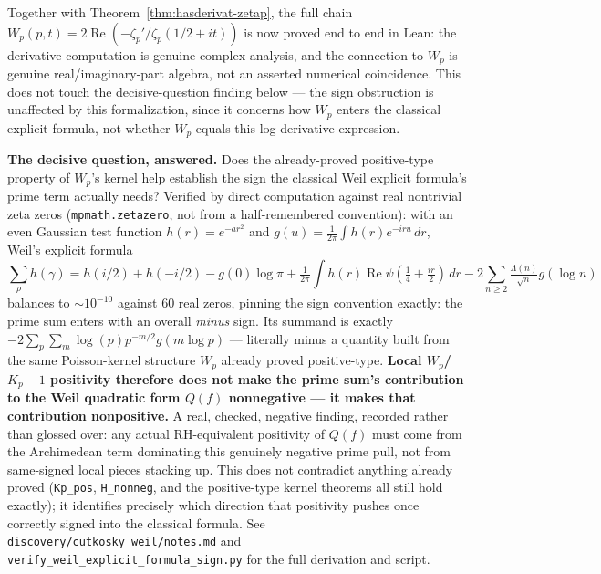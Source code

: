 \documentclass{report}
\theoremstyle{definition}
\begin{document}
Together with Theorem~\ref{thm:hasderivat-zetap}, the full chain
$W_p(p,t) = 2\operatorname{Re}(-\zeta_p'/\zeta_p(1/2+it))$ is now proved end to end in Lean:
the derivative computation is genuine complex analysis, and the connection to $W_p$ is
genuine real/imaginary-part algebra, not an asserted numerical coincidence. This does not
touch the decisive-question finding below --- the sign obstruction is unaffected by this
formalization, since it concerns how $W_p$ enters the classical explicit formula, not
whether $W_p$ equals this log-derivative expression.

\textbf{The decisive question, answered.} Does the already-proved positive-type property
of $W_p$'s kernel help establish the sign the classical Weil explicit formula's prime
term actually needs? Verified by direct computation against real nontrivial zeta zeros
(\texttt{mpmath.zetazero}, not from a half-remembered convention): with an even Gaussian
test function $h(r)=e^{-ar^2}$ and $g(u)=\tfrac1{2\pi}\int h(r)e^{-iru}\,dr$, Weil's
explicit formula
\[
\textstyle\sum_\rho h(\gamma) = h(i/2)+h(-i/2) - g(0)\log\pi
+ \tfrac1{2\pi}\int h(r)\operatorname{Re}\psi(\tfrac14+\tfrac{ir}2)\,dr
- 2\sum_{n\ge2}\tfrac{\Lambda(n)}{\sqrt n}g(\log n)
\]
balances to $\sim10^{-10}$ against 60 real zeros, pinning the sign convention exactly:
the prime sum enters with an overall \emph{minus} sign. Its summand is exactly
$-2\sum_p\sum_m\log(p)p^{-m/2}g(m\log p)$ --- literally minus a quantity built from the
same Poisson-kernel structure $W_p$ already proved positive-type. \textbf{Local
$W_p$/$K_p-1$ positivity therefore does not make the prime sum's contribution to the
Weil quadratic form $Q(f)$ nonnegative --- it makes that contribution nonpositive.} A
real, checked, negative finding, recorded rather than glossed over: any actual
RH-equivalent positivity of $Q(f)$ must come from the Archimedean term dominating this
genuinely negative prime pull, not from same-signed local pieces stacking up. This does
not contradict anything already proved (\texttt{Kp\_pos}, \texttt{H\_nonneg}, and the
positive-type kernel theorems all still hold exactly); it identifies precisely which
direction that positivity pushes once correctly signed into the classical formula. See
\texttt{discovery/cutkosky\_weil/notes.md} and
\texttt{verify\_weil\_explicit\_formula\_sign.py} for the full derivation and script.
\end{document}
